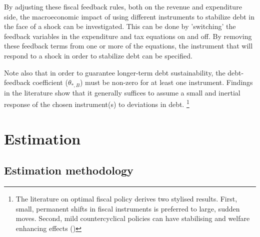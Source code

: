 \documentclass[a4paper,11pt]{article}
\numberwithin{equation}{section}
\begin{document}
	By adjusting these fiscal feedback rules, both on the revenue and expenditure side, the macroeconomic impact of using different instruments to stabilize debt in the face of a shock can be investigated. This can be done by 'switching' the feedback variables in the expenditure and tax equations on and off. By removing these feedback terms from one or more of the equations, the instrument that will respond to a shock in order to stabilize debt can be specified.
	
	Note also that in order to guarantee longer-term debt sustainability, the debt-feedback coefficient ($\theta_{*,B}$) must be non-zero for at least one instrument. Findings in the literature show that it generally suffices to assume a small and inertial response of the chosen instrument(s) to deviations in debt. \footnote{The literature on optimal fiscal policy derives two stylised results. First, small, permanent shifts in fiscal instruments is preferred to large, sudden moves. Second, mild countercyclical policies can have stabilising and welfare enhancing effects (\citealp{stahler2012})} 
	
	
	
	
	
	
	
	\section{Estimation} \label{estimation}
	\subsection{Estimation methodology}
	
\end{document}

